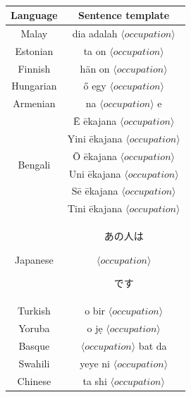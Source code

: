 \documentclass[fleqn,10pt]{article}
\begin{document}
\begin{table}[H]
\centering
\small{
	\begin{tabular}{|c|c|}
	\hline
	Language 	& Sentence template 													\\ \hline \hline
	Malay		& dia adalah $\langle occupation \rangle$ 								\\ \hline
	Estonian	& ta on $\langle occupation \rangle$ 									\\ \hline
	Finnish		& hän on $\langle occupation \rangle$ 									\\ \hline
	Hungarian	& ő egy $\langle occupation \rangle$ 									\\ \hline
	Armenian	& na $\langle occupation \rangle$ e 									\\ \hline
	\multirow{6}{*}{Bengali}	& Ē ēkajana $\langle occupation \rangle$				\\
								& Yini ēkajana $\langle occupation \rangle$		\\
								& Ō ēkajana $\langle occupation \rangle$				\\
								& Uni ēkajana $\langle occupation \rangle$			\\
								& Sē ēkajana $\langle occupation \rangle$			\\
								& Tini ēkajana $\langle occupation \rangle$		\\ \hline
	Japanese	& \begin{CJK*}{UTF8}{min}あの人は\end{CJK*} $\langle occupation \rangle$ \begin{CJK*}{UTF8}{min}です\end{CJK*}		\\ \hline
	Turkish		& o bir $\langle occupation \rangle$ 									\\ \hline
	Yoruba		& o jẹ $\langle occupation \rangle$ 									\\ \hline
	Basque		& $\langle occupation \rangle$ bat da 										\\ \hline
	Swahili		& yeye ni $\langle occupation \rangle$ 									\\ \hline
	Chinese		& ta shi $\langle occupation \rangle$ 										\\ \hline
	\end{tabular}
	}
	\caption{}
	\label{tab:templates-occupations}
\end{table}
\end{document}
